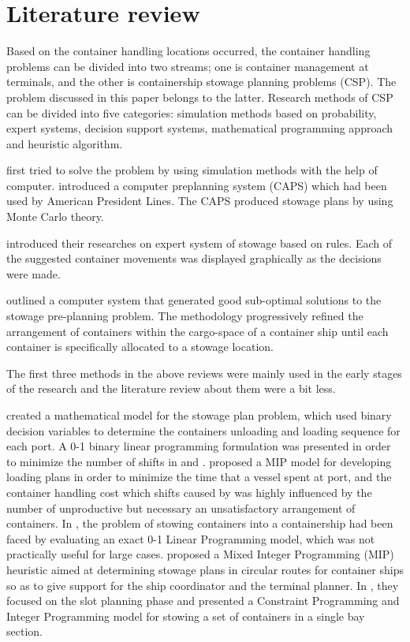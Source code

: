 \documentclass[review,3p,times,authoryear,12pt]{elsarticle}
\begin{document}
\section{Literature review}
\label{sec:lr}
Based on the container handling locations occurred, the container handling problems can be divided into two streams; one is container management at terminals, and the other is containership stowage planning problems (CSP).
The problem discussed in this paper belongs to the latter.
Research methods of CSP can be divided into five categories: simulation methods based on probability, expert systems, decision support systems, mathematical programming approach and heuristic algorithm.

\cite{webster1970container} first tried to solve the problem by using simulation methods with the help of computer.
\cite{shields1984containership} introduced a computer preplanning system (CAPS) which had been used by American President Lines.
The CAPS produced stowage plans by using Monte Carlo theory.

\cite{dillingham1986application} introduced their researches on expert system of stowage based on rules.
Each of the suggested container movements was displayed graphically as the decisions were made.

\cite{wilson2001container} outlined a computer system that generated good sub-optimal solutions to the stowage pre-planning problem.
The methodology progressively refined the arrangement of containers within the cargo-space of a container ship until each container is specifically allocated to a stowage location.

The first three methods in the above reviews were mainly used in the early stages of the research and the literature review about them were a bit less.

\cite{botter1991stowage} created a mathematical model for the stowage plan problem, which used binary decision variables to determine the containers unloading and loading sequence for each port.
A 0-1 binary linear programming formulation was presented in order to minimize the number of shifts in \cite{avriel1998stowage} and \cite{avriel2000container}.
\cite{haghani2001model} proposed a MIP model for developing loading plans in order to minimize the time that a vessel spent at port, and the container handling cost which shifts caused by was highly influenced by the number of unproductive but necessary an unsatisfactory arrangement of containers.
In \cite{ambrosino2004stowing}, the problem of stowing containers into a containership had been faced by evaluating an exact 0-1 Linear Programming model, which was not practically useful for large cases.
\cite{ambrosino2015mip} proposed a Mixed  Integer  Programming (MIP) heuristic aimed at determining stowage plans in circular routes for container ships so as to give support for the ship coordinator and the terminal planner.
In \cite{parreno2016grasp}, they focused on the slot planning phase and presented a Constraint Programming and Integer Programming model for stowing a set of containers in a single bay section.
\end{document}
